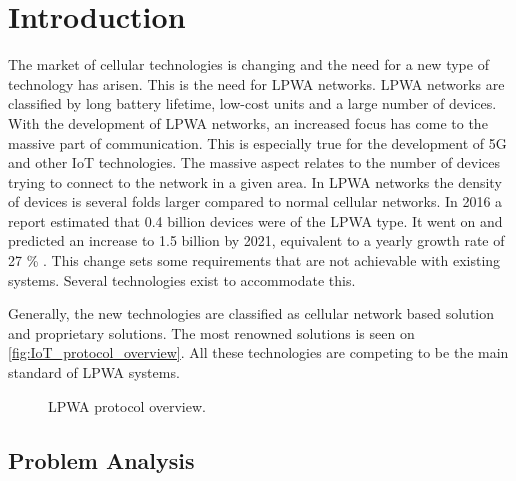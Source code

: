 \chapter{Introduction}\label{ch:Introduction}




The market of cellular technologies is changing and the need for a new type of technology has arisen. This is the need for \gls{LPWA} networks. \gls{LPWA} networks are classified by long battery lifetime, low-cost units and a large number of devices.  With the development of \gls{LPWA} networks,  an increased focus has come to the massive part of communication. This is especially true for the development of 5G and other \gls{IoT} technologies. The massive aspect relates to the number of devices trying to connect to the network in a given area.  In \gls{LPWA} networks the density of devices is several folds larger compared to normal cellular networks. In 2016 a report estimated that 0.4 billion devices were of the \gls{LPWA} type. It went on and predicted an increase to 1.5 billion by 2021, equivalent to a yearly growth rate of 27 \% \citep{mobi-report}. This change sets some requirements that are not achievable with existing systems. Several technologies exist to accommodate this.


Generally, the new technologies are classified as cellular network based solution and proprietary solutions. The most renowned solutions is seen on \autoref{fig:IoT_protocol_overview}. All these technologies are competing to be the main standard of LPWA systems. 

\begin{figure}[H]
\centering
\caption{LPWA protocol overview.}
\label{fig:IoT_protocol_overview}
\end{figure}



\section{Problem Analysis}

